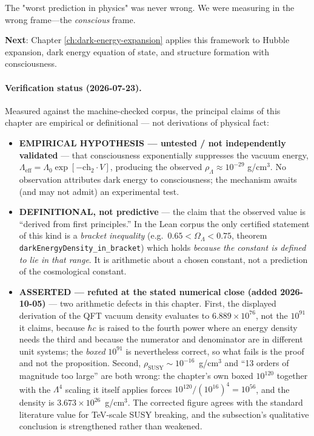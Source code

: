 The "worst prediction in physics" was never wrong. We were measuring in the wrong frame—the \textit{conscious} frame.

\textbf{Next}: Chapter \ref{ch:dark-energy-expansion} applies this framework to Hubble expansion, dark energy equation of state, and structure formation with consciousness.

\paragraph{Verification status (2026-07-23).}
Measured against the machine-checked corpus, the principal claims of this chapter
are empirical or definitional --- not derivations of physical fact:
\begin{itemize}
\item \textbf{EMPIRICAL HYPOTHESIS --- untested / not independently validated} ---
  that consciousness exponentially suppresses the vacuum energy,
  $\Lambda_{\text{eff}}=\Lambda_0\exp[-\text{ch}_2\cdot V]$, producing the observed
  $\rho_\Lambda\approx10^{-29}$ g/cm$^3$. No observation attributes dark energy to
  consciousness; the mechanism awaits (and may not admit) an experimental test.
\item \textbf{DEFINITIONAL, not predictive} --- the claim that the observed value is
  ``derived from first principles.'' In the Lean corpus the only certified statement
  of this kind is a \emph{bracket inequality} (e.g.\ $0.65<\Omega_\Lambda<0.75$,
  theorem \texttt{darkEnergyDensity\_in\_bracket}) which holds \emph{because the
  constant is defined to lie in that range}. It is arithmetic about a chosen
  constant, not a prediction of the cosmological constant.
\item \textbf{ASSERTED --- refuted at the stated numerical close (added
2026-10-05)} --- two arithmetic defects in this chapter. First, the displayed
derivation of the QFT vacuum density evaluates to $6.889\times10^{76}$, not the
$10^{91}$ it claims, because $\hbar c$ is raised to the fourth power where an
energy density needs the third and because the numerator and denominator are in
different unit systems; the \emph{boxed} $10^{91}$ is nevertheless correct, so
what fails is the proof and not the proposition. Second,
$\rho_{\text{SUSY}}\sim10^{-16}$~g/cm$^3$ and ``13 orders of magnitude too
large'' are both wrong: the chapter's own boxed $10^{120}$ together with the
$\Lambda^4$ scaling it itself applies forces $10^{120}/(10^{16})^4 = 10^{56}$,
and the density is $3.673\times10^{26}$~g/cm$^3$. The corrected figure agrees
with the standard literature value for TeV-scale SUSY breaking, and the
subsection's qualitative conclusion is strengthened rather than weakened.


\end{itemize}

